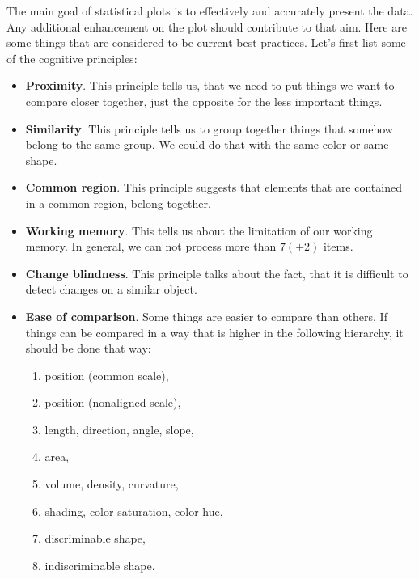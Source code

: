 \documentclass[fleqn,moreauthors,10pt]{ds_report}
\begin{document}
	The main goal of statistical plots is to effectively and accurately present the data. Any additional enhancement on the plot should contribute to that aim. Here are some things that are considered to be current best practices. Let's first list some of the cognitive principles:
	\begin{itemize}[noitemsep] 
		\item \textbf{Proximity}.
		This principle tells us, that we need to put things we want to compare closer together, just the opposite for the less important things.
		\item \textbf{Similarity}.
		This principle tells us to group together things that somehow belong to the same group. We could do that with the same color or same shape.
		\item \textbf{Common region}.
		This principle suggests that elements that are contained in a common region, belong together.
		\item \textbf{Working memory}.
		This tells us about the limitation of our working memory. In general, we can not process more than $7 (\pm 2)$ items.
		\item \textbf{Change blindness}.
		This principle talks about the fact, that it is difficult to detect changes on a similar object.
		\item \textbf{Ease of comparison}.
		Some things are easier to compare than others. If things can be compared in a way that is higher in the following hierarchy, it should be done that way:
		\begin{enumerate}[noitemsep] 
			\item position (common scale),
			\item position (nonaligned scale),
			\item length, direction, angle, slope,
			\item area,
			\item volume, density, curvature,
			\item shading, color saturation, color hue,
			\item discriminable shape,
			\item indiscriminable shape.
		\end{enumerate}
	\end{itemize}
\end{document}
